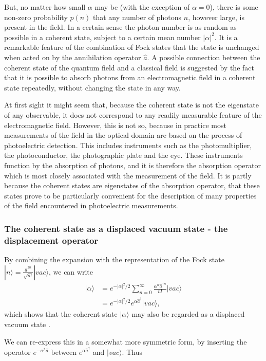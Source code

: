 {But, no matter how small $\alpha$ may be (with the exception of $\alpha=0$), there is some non-zero probability $p(n)$ that any number of photons $n$, however large, is present in the field. In a certain sense the photon number is as random as possible in a coherent state, subject to a certain mean number $|\alpha|^{2}$. It is a remarkable feature of the combination of Fock states that the state is unchanged when acted on by the annihilation operator $\hat{a}$. A possible connection between the coherent state of the quantum field and a classical field is suggested by the fact that it is possible to absorb photons from an electromagnetic field in a coherent state repeatedly, without changing the state in any way.}

{At first sight it might seem that, because the coherent state is not the eigenstate of any observable, it does not correspond to any readily measurable feature of the electromagnetic field. However, this is not so, because in practice most measurements of the field in the optical domain are based on the process of photoelectric detection. This includes instruments such as the photomultiplier, the photoconductor, the photographic plate and the eye. These instruments function by the absorption of photons, and it is therefore the absorption operator which is most closely associated with the measurement of the field. It is partly because the coherent states are eigenstates of the absorption operator, that these states prove to be particularly convenient for the description of many properties of the field encountered in photoelectric measurements.}

\subsubsection{The coherent state as a displaced vacuum state - the displacement operator}

By combining the expansion with the representation of the Fock state $|n\rangle = \frac{\hat{a}^{\dagger n}}{\sqrt{n!}}| vac\rangle$, we can write
\begin{align*}
|\alpha\rangle &= e^{-|\alpha|^{2}/2}\sum_{n=0}^{\infty}\frac{\alpha^{n}\hat{a}^{\dagger n}}{n!}|vac\rangle \\
&= e^{-|\alpha|^{2}/2}e^{\alpha\hat{a}^{\dagger}}|vac\rangle,
\end{align*}
which shows that the coherent state $|\alpha\rangle$ may also be regarded as a displaced vacuum state .

We can re-express this in a somewhat more symmetric form, by inserting the operator $e^{-\alpha^{*}\hat{a}}$ between $e^{\alpha\hat{a}^{\dagger}}$ and $|vac\rangle$. Thus

